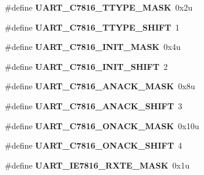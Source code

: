\begin{DoxyCompactItemize}
\item 
\#define {\bfseries U\+A\+R\+T\+\_\+\+C7816\+\_\+\+T\+T\+Y\+P\+E\+\_\+\+M\+A\+SK}~0x2u\hypertarget{group__UART__Register__Masks_ga5c2601e69d81abd9d74da1eedefe0073}{}\label{group__UART__Register__Masks_ga5c2601e69d81abd9d74da1eedefe0073}

\item 
\#define {\bfseries U\+A\+R\+T\+\_\+\+C7816\+\_\+\+T\+T\+Y\+P\+E\+\_\+\+S\+H\+I\+FT}~1\hypertarget{group__UART__Register__Masks_ga53eb4e563ed15c4c1e73d1fd15a77b2e}{}\label{group__UART__Register__Masks_ga53eb4e563ed15c4c1e73d1fd15a77b2e}

\item 
\#define {\bfseries U\+A\+R\+T\+\_\+\+C7816\+\_\+\+I\+N\+I\+T\+\_\+\+M\+A\+SK}~0x4u\hypertarget{group__UART__Register__Masks_ga52afeea9fbaec9489c45792a907b195b}{}\label{group__UART__Register__Masks_ga52afeea9fbaec9489c45792a907b195b}

\item 
\#define {\bfseries U\+A\+R\+T\+\_\+\+C7816\+\_\+\+I\+N\+I\+T\+\_\+\+S\+H\+I\+FT}~2\hypertarget{group__UART__Register__Masks_ga7fe58f80db753fac78feefc4ab257d0d}{}\label{group__UART__Register__Masks_ga7fe58f80db753fac78feefc4ab257d0d}

\item 
\#define {\bfseries U\+A\+R\+T\+\_\+\+C7816\+\_\+\+A\+N\+A\+C\+K\+\_\+\+M\+A\+SK}~0x8u\hypertarget{group__UART__Register__Masks_ga7d492736d5d2ffba794d54fa0d6b8d92}{}\label{group__UART__Register__Masks_ga7d492736d5d2ffba794d54fa0d6b8d92}

\item 
\#define {\bfseries U\+A\+R\+T\+\_\+\+C7816\+\_\+\+A\+N\+A\+C\+K\+\_\+\+S\+H\+I\+FT}~3\hypertarget{group__UART__Register__Masks_gae5c391d165239e4ed2d80e7ac31a0232}{}\label{group__UART__Register__Masks_gae5c391d165239e4ed2d80e7ac31a0232}

\item 
\#define {\bfseries U\+A\+R\+T\+\_\+\+C7816\+\_\+\+O\+N\+A\+C\+K\+\_\+\+M\+A\+SK}~0x10u\hypertarget{group__UART__Register__Masks_ga031dcabb12ed66e1a74a735e962c0418}{}\label{group__UART__Register__Masks_ga031dcabb12ed66e1a74a735e962c0418}

\item 
\#define {\bfseries U\+A\+R\+T\+\_\+\+C7816\+\_\+\+O\+N\+A\+C\+K\+\_\+\+S\+H\+I\+FT}~4\hypertarget{group__UART__Register__Masks_ga969b1c4c1e85e7745b73b993b93b4c6f}{}\label{group__UART__Register__Masks_ga969b1c4c1e85e7745b73b993b93b4c6f}

\item 
\#define {\bfseries U\+A\+R\+T\+\_\+\+I\+E7816\+\_\+\+R\+X\+T\+E\+\_\+\+M\+A\+SK}~0x1u\hypertarget{group__UART__Register__Masks_gad8d954bf21c5ed93f49c9418f0b1bc5e}{}\label{group__UART__Register__Masks_gad8d954bf21c5ed93f49c9418f0b1bc5e}


\end{DoxyCompactItemize}
